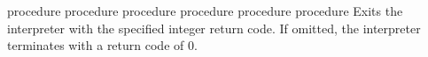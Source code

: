 \begin{entry}{%
 {procedure}
 {procedure}
 {procedure}
 {procedure}
 {procedure}
 {procedure}}
\saut
Exits the {\stk} interpreter with the specified integer return code. If
omitted, the interpreter terminates with a return code of 0.
\end{entry}


